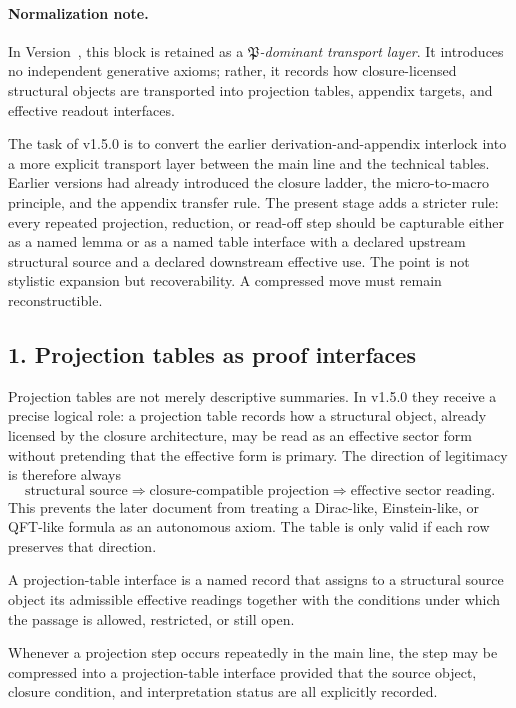 \paragraph{Normalization note.} In Version~\docversion, this block is retained as a \emph{$\mathfrak P$-dominant transport layer}. It introduces no independent generative axioms; rather, it records how closure-licensed structural objects are transported into projection tables, appendix targets, and effective readout interfaces.


The task of v1.5.0 is to convert the earlier derivation-and-appendix
interlock into a more explicit transport layer between the main line and the
technical tables. Earlier versions had already introduced the closure ladder,
the micro-to-macro principle, and the appendix transfer rule. The present stage
adds a stricter rule: every repeated projection, reduction, or read-off step
should be capturable either as a named lemma or as a named table interface with
a declared upstream structural source and a declared downstream effective use.
The point is not stylistic expansion but recoverability. A compressed move must
remain reconstructible.

\subsection*{1. Projection tables as proof interfaces}
Projection tables are not merely descriptive summaries. In v1.5.0 they
receive a precise logical role: a projection table records how a structural
object, already licensed by the closure architecture, may be read as an
effective sector form without pretending that the effective form is primary.
The direction of legitimacy is therefore always
\[
\text{structural source} \Longrightarrow \text{closure-compatible projection}
\Longrightarrow \text{effective sector reading.}
\]
This prevents the later document from treating a Dirac-like, Einstein-like, or
QFT-like formula as an autonomous axiom. The table is only valid if each row
preserves that direction.

\begin{definition}
A projection-table interface is a named record that assigns to a structural
source object its admissible effective readings together with the conditions
under which the passage is allowed, restricted, or still open.
\end{definition}

\begin{lemma}
\label{lem:projection-interface-lemma}
Whenever a projection step occurs repeatedly in the main line, the step may be
compressed into a projection-table interface provided that the source object,
closure condition, and interpretation status are all explicitly recorded.
\end{lemma}

